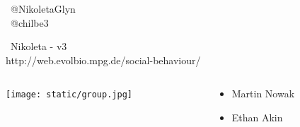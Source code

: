 \documentclass{beamer}
\begin{document}
\begin{frame}
    \begin{center}
    \faTwitter \ @NikoletaGlyn \\
    \faTwitter \ @chilbe3 \\
    \vspace{1cm}

    \faGithub \ Nikoleta - v3 \\
    http://web.evolbio.mpg.de/social-behaviour/ \\
    \vspace{1cm}

    \begin{columns}
    \begin{column}{.6\textwidth}
            \texttt{[image: static/group.jpg]}
    \end{column}
    \begin{column}{.4\textwidth}
        \begin{itemize}
            \item Martin Nowak
            \item Ethan Akin
        \end{itemize}
    \end{column}
    \end{columns}
    \end{center}
\end{frame}
\end{document}
